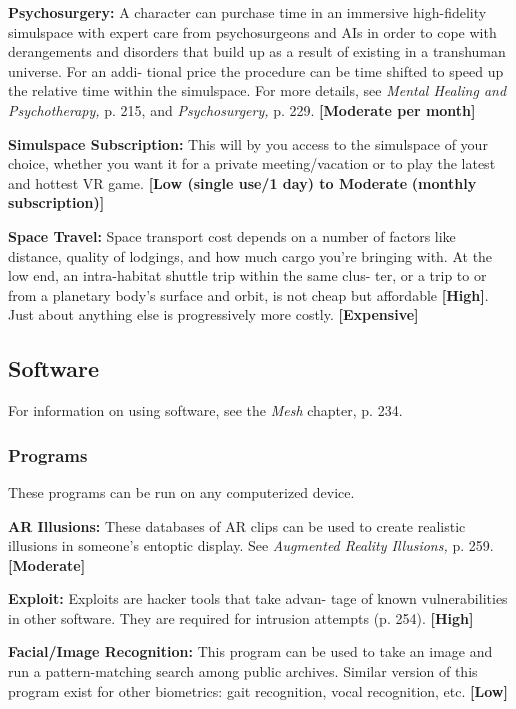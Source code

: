 \textbf{Psychosurgery:} A character can purchase time in an 
immersive high-fidelity simulspace with expert care 
from psychosurgeons and AIs in order to cope with 
derangements and disorders that build up as a result 
of existing in a transhuman universe. For an addi-
tional price the procedure can be time shifted to speed 
up the relative time within the simulspace. For more 
details, see \textit{Mental Healing and Psychotherapy,} p. 215, 
and \textit{Psychosurgery,} p. 229. \textbf{[Moderate per month]}

\textbf{Simulspace Subscription: }This will by you access to 
the simulspace of your choice, whether you want it for 
a private meeting/vacation or to play the latest and 
hottest VR game. \textbf{[Low (single use/1 day) to Moderate }
\textbf{(monthly subscription)]}

\textbf{Space Travel:} Space transport cost depends on a 
number of factors like distance, quality of lodgings, 
and how much cargo you're bringing with. At the low 
end, an intra-habitat shuttle trip within the same clus-
ter, or a trip to or from a planetary body's surface and 
orbit, is not cheap but affordable \textbf{[High]}. Just about 
anything else is progressively more costly. \textbf{[Expensive]}

\subsection{Software}

For information on using software, see the \textit{Mesh }
chapter, p. 234.

\subsubsection{Programs}

These programs can be run on any computerized device.

\textbf{AR Illusions:} These databases of AR clips can be used 
to create realistic illusions in someone's entoptic display. 
See \textit{Augmented Reality Illusions,} p. 259. \textbf{[Moderate]}

\textbf{Exploit:} Exploits are hacker tools that take advan-
tage of known vulnerabilities in other software. They 
are required for intrusion attempts (p. 254). \textbf{[High]}

\textbf{Facial/Image Recognition:} This program can be 
used to take an image and run a pattern-matching 
search among public archives. Similar version of this 
program exist for other biometrics: gait recognition, 
vocal recognition, etc. \textbf{[Low]}

